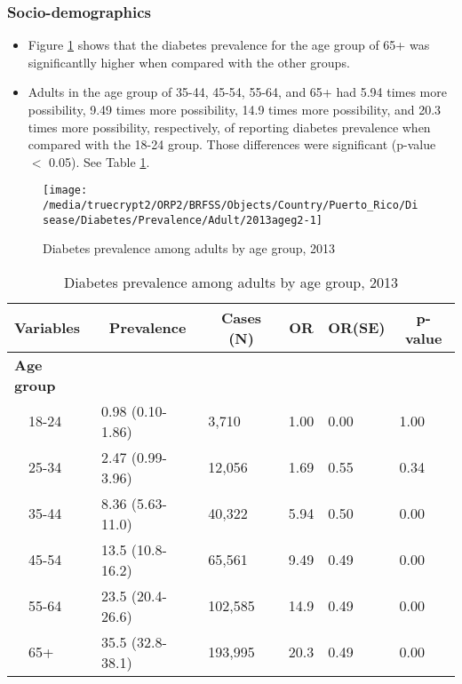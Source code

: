 \newpage
\subsubsection{Socio-demographics}

\begin{itemize}

\item Figure \ref{fig:age.Diabetes.2013} shows that the diabetes prevalence for the age group of 65+ was significantlly higher when compared with the other groups.

\item Adults in the age group of 35-44, 45-54, 55-64, and 65+ had 5.94 times more possibility, 9.49 times more possibility, 14.9 times more possibility, and 20.3 times more possibility, respectively, of reporting diabetes prevalence when compared with the 18-24 group. Those differences were significant (p-value $<$ 0.05). See Table \ref{tab:age.Diabetes.2013}.


\end{itemize}


\begin{figure}[H]
\caption{Diabetes prevalence among adults by age group, 
2013}
\begin{knitrout}
\color{fgcolor}

{\centering \texttt{[image: /media/truecrypt2/ORP2/BRFSS/Objects/Country/Puerto\_Rico/Disease/Diabetes/Prevalence/Adult/2013ageg2-1]} 

}



\end{knitrout}
\label{fig:age.Diabetes.2013}
\end{figure}

\begin{table}[H]
\caption{Diabetes prevalence  among adults by age group, 2013\label{tab:age.Diabetes.2013}} 
\begin{center}
\begin{tabular}{llllll}
\hline\hline
\multicolumn{1}{l}{Variables}&\multicolumn{1}{c}{Prevalence}&\multicolumn{1}{c}{Cases (N)}&\multicolumn{1}{c}{OR}&\multicolumn{1}{c}{OR(SE)}&\multicolumn{1}{c}{p-value}\tabularnewline
\hline
{\bfseries Age group}&&&&&\tabularnewline
~~18-24&0.98 (0.10-1.86)&  3,710&1.00&0.00&1.00\tabularnewline
~~25-34&2.47 (0.99-3.96)& 12,056&1.69&0.55&0.34\tabularnewline
~~35-44&8.36 (5.63-11.0)& 40,322&5.94&0.50&0.00\tabularnewline
~~45-54&13.5 (10.8-16.2)& 65,561&9.49&0.49&0.00\tabularnewline
~~55-64&23.5 (20.4-26.6)&102,585&14.9&0.49&0.00\tabularnewline
~~65+&35.5 (32.8-38.1)&193,995&20.3&0.49&0.00\tabularnewline
\hline
\end{tabular}\end{center}

\end{table}


